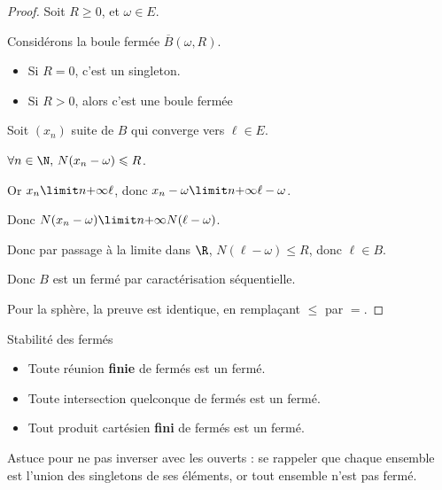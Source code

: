 \begin{proof}
    Soit $R \geqslant 0$, et $\omega \in E$.

    Considérons la boule fermée $\overline{B}(\omega, R)$.

    \begin{itemize}
        \item Si $R = 0$, c'est un singleton. 
        \item Si $R > 0$, alors c'est une boule fermée
    \end{itemize}

    Soit $(x_n)$ suite de $B$ qui converge vers $\ell \in E$.

    $\forall n \in \N, \, N(x_n - \omega) \leqslant R$.

    Or $x_n \limit n {+ \infty} \ell$, donc $x_n - \omega \limit n {+ \infty} \ell - \omega$.

    Donc $N(x_n - \omega) \limit n {+ \infty} N(\ell - \omega)$.

    Donc par passage à la limite dans $\R$, $N(\ell - \omega ) \leqslant R$, donc $\ell \in B$.

    Donc $B$ est un fermé par caractérisation séquentielle.

    Pour la sphère, la preuve est identique, en remplaçant $\leqslant$ par $=$.
\end{proof}

\begin{proposition}{Stabilité des fermés}{}
    \begin{itemize}
        \item Toute réunion \textbf{finie} de fermés est un fermé.
        \item Toute intersection quelconque de fermés est un fermé.
        \item Tout produit cartésien \textbf{fini} de fermés est un fermé.
    \end{itemize}
\end{proposition}

Astuce pour ne pas inverser avec les ouverts : se rappeler que chaque ensemble est l'union des singletons 
de ses éléments, or tout ensemble n'est pas fermé. 


